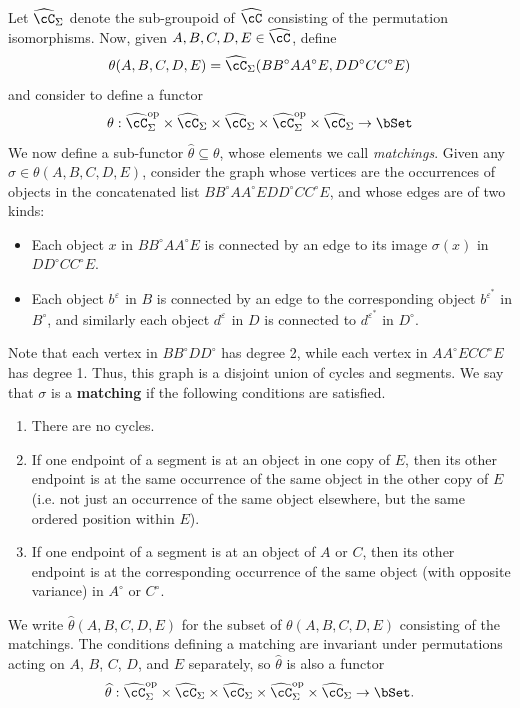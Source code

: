 \documentclass{amsart}
\newcommand{\C}{\cC}
\renewcommand{\Chat}{\ensuremath{\widehat{\C}}\xspace}
\newcommand{\Chats}{\ensuremath{\Chat_{\Sigma}}\xspace}
\newcommand{\thhat}{\ensuremath{\widehat{\theta}}\xspace}
\renewcommand{\o}{^{\circ}}
\newcommand{\e}[1][]{^{\varepsilon_{#1}}}
\newcommand{\epbar}{^{\varepsilon^*}}
\begin{document}
Let $\Chats$ denote the sub-groupoid of \Chat consisting of the permutation isomorphisms.
Now, given $A,B,C,D,E\in\Chat$, define
\[ \theta(A,B,C,D,E) = \Chats(B B\o A A\o E, D D\o C C\o E) \]
and consider \theta to define a functor
\[ \theta : \Chats\op \times \Chats \times \Chats \times \Chats\op \times \Chats \to \bSet \]
We now define a sub-functor $\thhat \subseteq \theta$, whose elements we call \emph{matchings}.
Given any $\sigma\in\theta(A,B,C,D,E)$, consider the graph whose vertices are the occurrences of objects in the concatenated list $B B\o A A\o E D D\o C C\o E$, and whose edges are of two kinds:
\begin{itemize}
\item Each object $x$ in $B B\o A A\o E$ is connected by an edge to its image $\sigma(x)$ in $D D\o C C\o E$.
\item Each object $b\e$ in $B$ is connected by an edge to the corresponding object $b\epbar$ in $B\o$, and similarly each object $d\e$ in $D$ is connected to $d\epbar$ in $D\o$.
\end{itemize}
Note that each vertex in $B B\o D D\o$ has degree 2, while each vertex in $A A\o E C C\o E$ has degree 1.
Thus, this graph is a disjoint union of cycles and segments.
We say that $\sigma$ is a \textbf{matching} if the following conditions are satisfied.
\begin{enumerate}
\item There are no cycles.
\item If one endpoint of a segment is at an object in one copy of $E$, then its other endpoint is at the same occurrence of the same object in the other copy of $E$ (i.e. not just an occurrence of the same object elsewhere, but the same ordered position within $E$).
\item If one endpoint of a segment is at an object of $A$ or $C$, then its other endpoint is at the corresponding occurrence of the same object (with opposite variance) in $A\o$ or $C\o$.
\end{enumerate}
We write $\thhat(A,B,C,D,E)$ for the subset of $\theta(A,B,C,D,E)$ consisting of the matchings.
The conditions defining a matching are invariant under permutations acting on $A$, $B$, $C$, $D$, and $E$ separately, so $\thhat$ is also a functor
\[ \thhat : \Chats\op \times \Chats \times \Chats \times \Chats\op \times \Chats \to \bSet. \]
\end{document}
